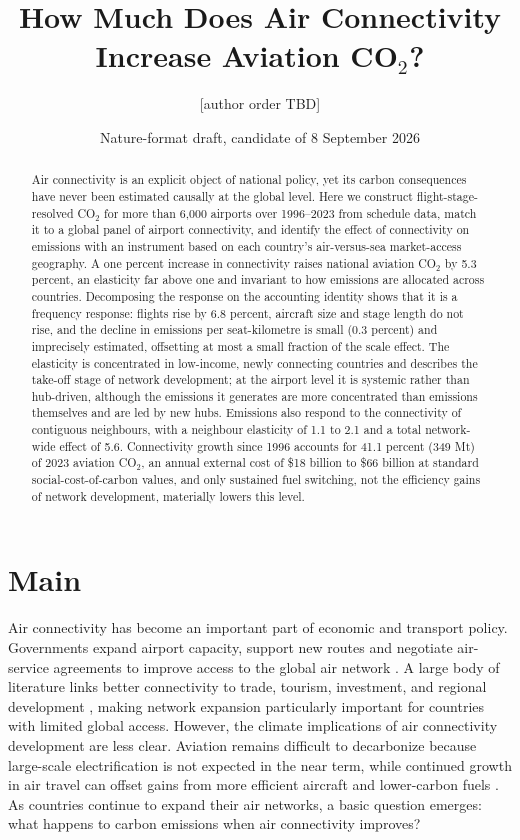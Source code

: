 \documentclass[12pt]{extarticle}
\title{How Much Does Air Connectivity Increase Aviation CO$_2$?}
\author{[author order TBD]}
\date{Nature-format draft, candidate of 8 September 2026}
\begin{document}
\maketitle

\begin{abstract}
\noindent Air connectivity is an explicit object of national policy, yet its
carbon consequences have never been estimated causally at the global level.
Here we construct flight-stage-resolved CO$_2$ for more than 6{,}000
airports over 1996--2023 from schedule data, match it to a global panel of
airport connectivity, and identify the effect of connectivity on emissions
with an instrument based on each country's air-versus-sea market-access
geography. A one percent increase in connectivity raises national aviation
CO$_2$ by 5.3 percent, an elasticity far above one and invariant to how
emissions are allocated across countries. Decomposing the response on the
accounting identity shows that it is a frequency response: flights rise by
6.8 percent, aircraft size and stage length do not rise, and the decline in
emissions per seat-kilometre is small (0.3 percent) and imprecisely
estimated, offsetting at most a small fraction of the scale effect. 
The elasticity is concentrated in low-income, newly connecting
countries and describes the take-off stage of network development; at the airport level it is systemic rather than hub-driven,
although the emissions it generates are more concentrated than emissions
themselves and are led by new hubs. Emissions also respond to the
connectivity of contiguous neighbours, with a neighbour elasticity of 1.1
to 2.1 and a total network-wide effect of 5.6. Connectivity growth since
1996 accounts for 41.1 percent (349 Mt) of 2023 aviation CO$_2$, an annual
external cost of \$18 billion to \$66 billion at standard social-cost-of-carbon
values, and only sustained fuel switching, not the efficiency gains of
network development, materially lowers this level.
\end{abstract}

\section*{Main}
Air connectivity has become an important part of economic and transport
policy. Governments expand airport capacity, support new routes and
negotiate air-service agreements to improve access to the global air
network \citep{fageda2018,piermartini2013}. A large body of literature
links better connectivity to trade, tourism, investment, and regional
development \citep{lenaerts2021,zhang2020}, making network expansion
particularly important for countries with limited global access. However,
the climate implications of air connectivity development are less clear.
Aviation remains difficult to decarbonize because large-scale
electrification is not expected in the near term, while continued growth
in air travel can offset gains from more efficient aircraft and
lower-carbon fuels \citep{bergero2023,sacchi2023}. As countries continue
to expand their air networks, a basic question emerges: what happens to
carbon emissions when air connectivity improves?
\end{document}
